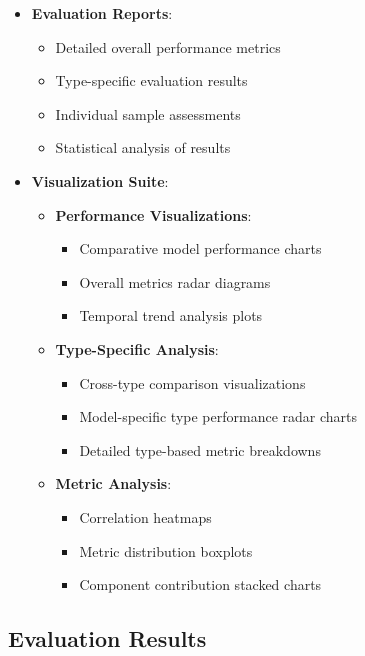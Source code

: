 \begin{itemize}
    \item \textbf{Evaluation Reports}:
    \begin{itemize}
        \item Detailed overall performance metrics
        \item Type-specific evaluation results
        \item Individual sample assessments
        \item Statistical analysis of results
    \end{itemize}

    \item \textbf{Visualization Suite}:
    \begin{itemize}
        \item \textbf{Performance Visualizations}:
        \begin{itemize}
            \item Comparative model performance charts
            \item Overall metrics radar diagrams
            \item Temporal trend analysis plots
        \end{itemize}

        \item \textbf{Type-Specific Analysis}:
        \begin{itemize}
            \item Cross-type comparison visualizations
            \item Model-specific type performance radar charts
            \item Detailed type-based metric breakdowns
        \end{itemize}

        \item \textbf{Metric Analysis}:
        \begin{itemize}
            \item Correlation heatmaps
            \item Metric distribution boxplots
            \item Component contribution stacked charts
        \end{itemize}
    \end{itemize}
\end{itemize}

\subsection{Evaluation Results}

